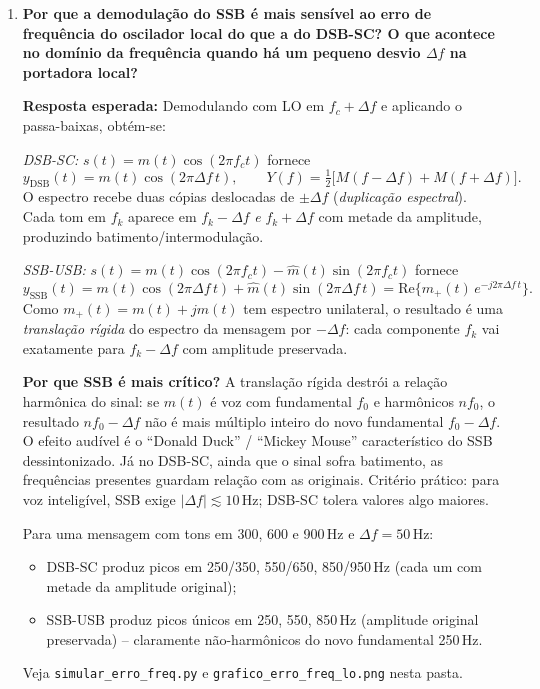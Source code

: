 \documentclass[11pt,a4paper]{article}
\begin{document}
\begin{enumerate}[label=\textbf{Q\arabic*.}, leftmargin=*, itemsep=1em]
    \begin{nota}
      Listar apenas as vantagens do SSB sem mencionar que a demodulação é mais complexa
      que no AM convencional com detector de envoltória.
    \end{nota}

  \item \textbf{Por que a demodulação do SSB é mais sensível ao erro de frequência do oscilador local do que a do DSB-SC? O que acontece no domínio da frequência quando há um pequeno desvio $\Delta f$ na portadora local?}

    \textbf{Resposta esperada:} Demodulando com LO em $f_c + \Delta f$ e aplicando o passa-baixas,
    obtém-se:

    \textit{DSB-SC:} $s(t) = m(t)\cos(2\pi f_c t)$ fornece
    \[
      y_{\text{DSB}}(t) = m(t)\cos(2\pi \Delta f\, t),
      \qquad
      Y(f) = \tfrac{1}{2}\bigl[M(f-\Delta f) + M(f+\Delta f)\bigr].
    \]
    O espectro recebe duas cópias deslocadas de $\pm\Delta f$ (\emph{duplicação espectral}).
    Cada tom em $f_k$ aparece em $f_k - \Delta f$ \emph{e} $f_k + \Delta f$ com metade da
    amplitude, produzindo batimento/intermodulação.

    \textit{SSB-USB:} $s(t) = m(t)\cos(2\pi f_c t) - \hat{m}(t)\sin(2\pi f_c t)$ fornece
    \[
      y_{\text{SSB}}(t) = m(t)\cos(2\pi \Delta f\, t) + \hat{m}(t)\sin(2\pi \Delta f\, t)
                       = \mathrm{Re}\bigl\{m_+(t)\,e^{-j2\pi \Delta f\, t}\bigr\}.
    \]
    Como $m_+(t) = m(t) + j\hat{m}(t)$ tem espectro unilateral, o resultado é uma
    \emph{translação rígida} do espectro da mensagem por $-\Delta f$: cada componente
    $f_k$ vai exatamente para $f_k - \Delta f$ com amplitude preservada.

    \textbf{Por que SSB é mais crítico?} A translação rígida destrói a relação harmônica
    do sinal: se $m(t)$ é voz com fundamental $f_0$ e harmônicos $n f_0$, o resultado
    $n f_0 - \Delta f$ não é mais múltiplo inteiro do novo fundamental $f_0 - \Delta f$.
    O efeito audível é o ``Donald Duck'' / ``Mickey Mouse'' característico do SSB
    dessintonizado. Já no DSB-SC, ainda que o sinal sofra batimento, as frequências
    presentes guardam relação com as originais. Critério prático: para voz inteligível,
    SSB exige $|\Delta f| \lesssim 10$\,Hz; DSB-SC tolera valores algo maiores.

    \begin{nota}
      Para uma mensagem com tons em 300, 600 e 900\,Hz e $\Delta f = 50$\,Hz:
      \begin{itemize}
        \item DSB-SC produz picos em 250/350, 550/650, 850/950\,Hz (cada um com metade
          da amplitude original);
        \item SSB-USB produz picos únicos em 250, 550, 850\,Hz (amplitude original
          preservada) -- claramente não-harmônicos do novo fundamental 250\,Hz.
      \end{itemize}
      Veja \texttt{simular\_erro\_freq.py} e \texttt{grafico\_erro\_freq\_lo.png}
      nesta pasta.
    \end{nota}


\end{enumerate}
\end{document}
